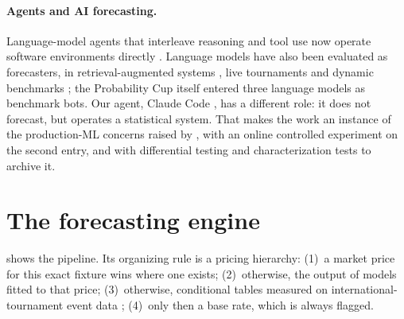 \documentclass[11pt]{article}
\begin{document}
\paragraph{Agents and AI forecasting.}
Language-model agents that interleave reasoning and tool use \citep{yao2023} now operate
software environments directly \citep{yang2024}. Language models have also been evaluated as
forecasters, in retrieval-augmented systems \citep{halawi2024}, live tournaments
\citep{schoenegger2023} and dynamic benchmarks \citep{karger2025}; the Probability Cup itself
entered three language models as benchmark bots. Our agent, Claude Code \citep{claudecode}, has
a different role: it does not forecast, but operates a statistical system. That makes the work
an instance of the production-ML concerns raised by \citet{sculley2015}, with an online
controlled experiment \citep{kohavi2020} on the second entry, and with differential testing
\citep{mckeeman1998} and characterization tests \citep{feathers2004} to archive it.

\section{The forecasting engine}\label{sec:engine}

 shows the pipeline. Its organizing rule is a pricing hierarchy: (1)~a
market price for this exact fixture wins where one exists; (2)~otherwise, the output of models
fitted to that price; (3)~otherwise, conditional tables measured on international-tournament
event data \citep{statsbomb}; (4)~only then a base rate, which is always flagged.
\end{document}
